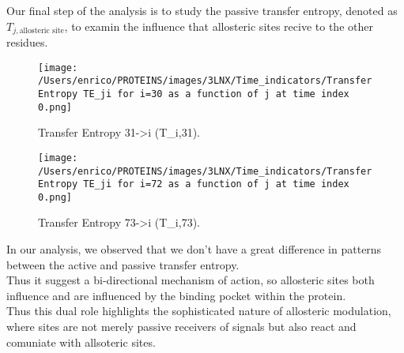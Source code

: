\documentclass[English, Lau, oneside]{sapthesis}
\begin{document}
\newpage
Our final step of the analysis is to study the passive transfer entropy, denoted as \( T_{j, \text{allosteric site}}\), to examin the influence that allosteric sites recive to the other residues.\\
\begin{figure}[h!]
    \centering
    \texttt{[image: /Users/enrico/PROTEINS/images/3LNX/Time\_indicators/Transfer Entropy TE\_ji for i=30 as a function of j at time index 0.png]}
    \caption{Transfer Entropy 31->i (T_{i,31}).}
    \label{fig:TE31_pass}
\end{figure}
\begin{figure}[h!]
    \centering
    \texttt{[image: /Users/enrico/PROTEINS/images/3LNX/Time\_indicators/Transfer Entropy TE\_ji for i=72 as a function of j at time index 0.png]}
    \caption{Transfer Entropy 73->i (T_{i,73}).}
    \label{fig:TE73_pass}
\end{figure}
\newpage
In our analysis, we observed that we don't have a great difference in patterns between the active and passive transfer entropy.\\
Thus it suggest a bi-directional mechanism of action, so allosteric sites both influence and are influenced by the binding pocket within the protein.\\
Thus this dual role highlights the sophisticated nature of allosteric modulation, where sites are not merely passive receivers of signals but also react and comuniate with allsoteric sites.

\newpage
\newpage
\end{document}
